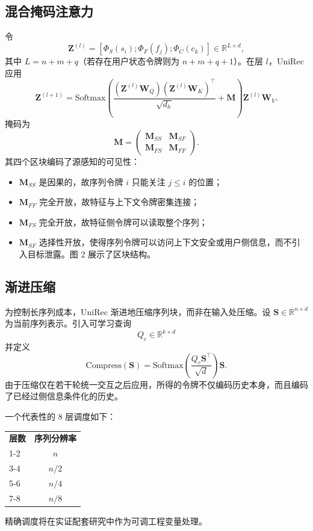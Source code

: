 \documentclass{article}
\begin{document}
\subsection{混合掩码注意力}

令
\[
\mathbf{Z}^{(l)} = [\Phi_S(s_i); \Phi_F(f_j); \Phi_C(c_k)] \in \mathbb{R}^{L \times d},
\]
其中 \(L = n+m+q\)（若存在用户状态令牌则为 \(n+m+q+1\)）。在层 \(l\)，UniRec 应用
\[
\mathbf{Z}^{(l+1)} = \mathrm{Softmax}\left(\frac{(\mathbf{Z}^{(l)}\mathbf{W}_Q)(\mathbf{Z}^{(l)}\mathbf{W}_K)^\top}{\sqrt{d_h}} + \mathbf{M}\right)\mathbf{Z}^{(l)}\mathbf{W}_V. \tag{4.4}
\]
掩码为
\[
\mathbf{M} = \begin{pmatrix}
\mathbf{M}_{SS} & \mathbf{M}_{SF}\\
\mathbf{M}_{FS} & \mathbf{M}_{FF}
\end{pmatrix}. \tag{4.5}
\]
其四个区块编码了源感知的可见性：
\begin{itemize}
\item \(\mathbf{M}_{SS}\) 是因果的，故序列令牌 \(i\) 只能关注 \(j \le i\) 的位置；
\item \(\mathbf{M}_{FF}\) 完全开放，故特征与上下文令牌密集连接；
\item \(\mathbf{M}_{FS}\) 完全开放，故特征侧令牌可以读取整个序列；
\item \(\mathbf{M}_{SF}\) 选择性开放，使得序列令牌可以访问上下文安全或用户侧信息，而不引入目标泄露。图 2 展示了区块结构。
\end{itemize}

\subsection{渐进压缩}

为控制长序列成本，UniRec 渐进地压缩序列块，而非在输入处压缩。设 \(\mathbf{S} \in \mathbb{R}^{n \times d}\) 为当前序列表示。引入可学习查询
\[
Q_c \in \mathbb{R}^{k \times d}
\]
并定义
\[
\mathrm{Compress}(\mathbf{S}) = \mathrm{Softmax}\left(\frac{Q_c \mathbf{S}^\top}{\sqrt{d}}\right)\mathbf{S}. \tag{4.6}
\]
由于压缩仅在若干轮统一交互之后应用，所得的令牌不仅编码历史本身，而且编码了已经过侧信息条件化的历史。

一个代表性的 8 层调度如下：
\begin{center}
\begin{tabular}{lc}
\textbf{层数} & \textbf{序列分辨率} \\
1-2 & \(n\) \\
3-4 & \(n/2\) \\
5-6 & \(n/4\) \\
7-8 & \(n/8\)
\end{tabular}
\end{center}
精确调度将在实证配套研究中作为可调工程变量处理。
\end{document}
